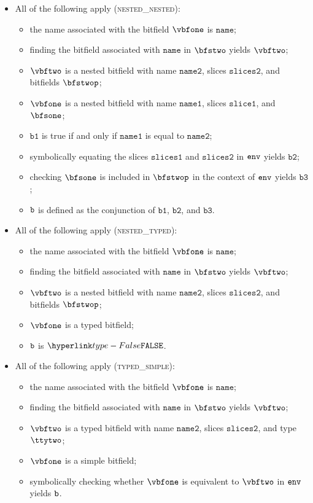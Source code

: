 \documentclass{book}
\newcommand\vbone[0]{\texttt{b1}}
\newcommand\vbtwo[0]{\texttt{b2}}
\newcommand\vbthree[0]{\texttt{b3}}
\newcommand\nameone[0]{\texttt{name1}}
\newcommand\nametwo[0]{\texttt{name2}}
\newcommand\sliceone[0]{\texttt{slice1}}
\newcommand\slicesone[0]{\texttt{slices1}}
\newcommand\slicestwo[0]{\texttt{slices2}}
\newcommand\name[0]{\texttt{name}}
\begin{document}
\begin{itemize}
  \item All of the following apply (\textsc{nested\_nested}):
  \begin{itemize}
    \item the name associated with the bitfield $\vbfone$ is $\name$;
    \item finding the bitfield associated with $\name$ in $\bfstwo$ yields $\vbftwo$;
    \item $\vbftwo$ is a nested bitfield with name $\nametwo$, slices $\slicestwo$, and bitfields $\bfstwop$;
    \item $\vbfone$ is a nested bitfield with name $\nameone$, slices $\sliceone$, and $\bfsone$;
    \item $\vbone$ is true if and only if $\nameone$ is equal to $\nametwo$;
    \item symbolically equating the slices $\slicesone$ and $\slicestwo$ in $\texttt{env}$ yields $\vbtwo$;
    \item checking $\bfsone$ is included in $\bfstwop$ in the context of $\texttt{env}$ yields $\vbthree$;
    \item $\texttt{b}$ is defined as the conjunction of $\vbone$, $\vbtwo$, and $\vbthree$.
  \end{itemize}

  \item All of the following apply (\textsc{nested\_typed}):
  \begin{itemize}
    \item the name associated with the bitfield $\vbfone$ is $\name$;
    \item finding the bitfield associated with $\name$ in $\bfstwo$ yields $\vbftwo$;
    \item $\vbftwo$ is a nested bitfield with name $\nametwo$, slices $\slicestwo$, and bitfields $\bfstwop$;
    \item $\vbfone$ is a typed bitfield;
    \item $\texttt{b}$ is $\False$.
  \end{itemize}

  \item All of the following apply (\textsc{typed\_simple}):
  \begin{itemize}
    \item the name associated with the bitfield $\vbfone$ is $\name$;
    \item finding the bitfield associated with $\name$ in $\bfstwo$ yields $\vbftwo$;
    \item $\vbftwo$ is a typed bitfield with name $\nametwo$, slices $\slicestwo$, and type $\ttytwo$;
    \item $\vbfone$ is a simple bitfield;
    \item symbolically checking whether $\vbfone$ is equivalent to $\vbftwo$ in $\texttt{env}$ yields $\texttt{b}$.
  \end{itemize}


\end{itemize}
\end{document}

